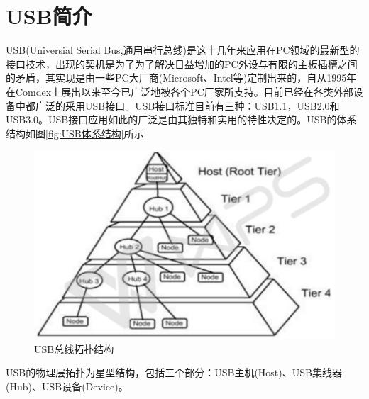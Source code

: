 \section{USB简介}
	USB(Universial Serial Bus,通用串行总线)是这十几年来应用在PC领域的最新型的接口技术，出现的契机是为了为了解决日益增加的PC外设与有限的主板插槽之间的矛盾，其实现是由一些PC大厂商(Microsoft、Intel等)定制出来的，自从1995年在Comdex上展出以来至今已广泛地被各个PC厂家所支持。目前已经在各类外部设备中都广泛的采用USB接口。USB接口标准目前有三种：USB1.1，USB2.0和USB3.0。USB接口应用如此的广泛是由其独特和实用的特性决定的。USB的体系结构如图\autoref{fig:USB体系结构}所示
\begin{figure}[!h]
\centering
\includegraphics[width=1.0\textwidth]{./graphics/usb-structure.pdf}
\caption{USB总线拓扑结构}\label{fig:USB体系结构}
\end{figure}

	USB的物理层拓扑为星型结构，包括三个部分：USB主机(Host)、USB集线器(Hub)、USB设备(Device)。
	
